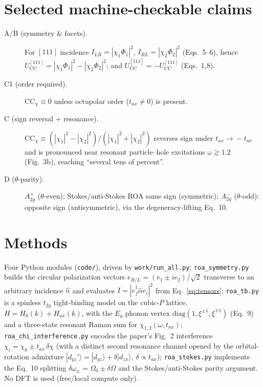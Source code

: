 \documentclass[11pt]{article}
\newcommand{\UCC}{U_{\mathrm{CC}}}
\newcommand{\CCchi}{\mathrm{CC}_\chi}
\begin{document}
\section{Selected machine-checkable claims}
\begin{description}
\item[A/B (symmetry \& facets).] For $[111]$ incidence $I_{LR}=|\chi_1\Phi_1|^2$,
$I_{RL}=|\chi_2\Phi_2|^2$ (Eqs.~5--6), hence $\UCC^{[111]}=|\chi_1\Phi_1|^2-|\chi_2\Phi_2|^2$;
and $\UCC^{[\bar111]}=-\UCC^{[111]}$ (Eqs.~1,8).
\item[C1 (order required).] $\CCchi\equiv0$ unless octupolar order ($t_{ax}\neq0$) is present.
\item[C (sign reversal + resonance).] $\CCchi\equiv(|\chi_1|^2-|\chi_2|^2)/(|\chi_1|^2+|\chi_2|^2)$
reverses sign under $t_{ax}\!\to\!-t_{ax}$ and is pronounced near resonant particle--hole
excitations $\omega\gtrsim1.2$ (Fig.~3b), reaching ``several tens of percent''.
\item[D ($\theta$-parity).] $A_{2g}^+$ ($\theta$-even): Stokes/anti-Stokes ROA same sign
(symmetric); $A_{2g}^-$ ($\theta$-odd): opposite sign (antisymmetric), via the
degeneracy-lifting Eq.~10.
\end{description}

\section{Methods}
Four Python modules (\texttt{code/}), driven by \texttt{work/run\_all.py}:
\texttt{roa\_symmetry.py} builds the circular polarization vectors
$e_{R/L}=(e_1\pm i e_2)/\sqrt2$ transverse to an arbitrary incidence $\hat n$ and evaluates
$I=|e_f^\dagger\hat\alpha e_i|^2$ from Eq.~\eqref{eq:tensors};
\texttt{roa\_tb.py} is a spinless $t_{2g}$ tight-binding model on the cubic-$P$ lattice,
$H=H_0(k)+H_{ax}(k)$, with the $E_g$ phonon vertex $\mathrm{diag}(1,\xi^{\pm1},\xi^{\mp1})$
(Eq.~9) and a three-state resonant Raman sum for $\chi_{1,2}(\omega,t_{ax})$;
\texttt{roa\_chi\_interference.py} encodes the paper's Fig.~2 interference
$\chi_i=\chi_0\pm t_{ax}\,\delta\chi$ (with a distinct second resonance channel opened by
the orbital-rotation admixture $|d_{yz}'\rangle=|d_{yz}\rangle+\delta|d_{zx}\rangle$,
$\delta\propto t_{ax}$); \texttt{roa\_stokes.py} implements the Eq.~10 splitting
$\delta\omega_\pm=\Omega_0\pm\delta\Omega$ and the Stokes/anti-Stokes parity argument.
No DFT is used (free/local compute only).
\end{document}

